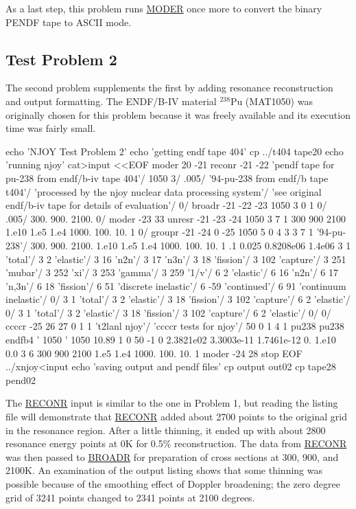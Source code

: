 As a last step, this problem runs \hyperlink{sMODERhy}{MODER}
once more to convert the binary PENDF tape to ASCII mode.


\subsection{Test Problem 2}
\label{ssMandT_2}

The second problem supplements the first by adding resonance
reconstruction and output formatting.  The ENDF/B-IV material
$^{238}$Pu (MAT1050) was originally chosen for this problem because
it was freely available and its execution time was fairly small.

\small
\begin{ccode}

echo 'NJOY Test Problem 2'
echo 'getting endf tape 404'
cp ../t404 tape20
echo 'running njoy'
cat>input <<EOF
 moder
 20 -21
 reconr
 -21 -22
 'pendf tape for pu-238 from endf/b-iv tape 404'/
 1050 3/
 .005/
 '94-pu-238 from endf/b tape t404'/
 'processed by the njoy nuclear data processing system'/
 'see original endf/b-iv tape for details of evaluation'/
 0/
 broadr
 -21 -22 -23
 1050 3 0 1 0/
 .005/
 300. 900. 2100.
 0/
 moder
 -23 33
 unresr
 -21 -23 -24
 1050 3 7 1
 300 900 2100
 1.e10 1.e5 1.e4 1000. 100. 10. 1
 0/
 groupr
 -21 -24 0 -25
 1050 5 0 4 3 3 7 1
 '94-pu-238'/
 300. 900. 2100.
 1.e10 1.e5 1.e4 1000. 100. 10. 1
 .1 0.025 0.8208e06 1.4e06
 3 1 'total'/
 3 2 'elastic'/
 3 16 'n2n'/
 3 17 'n3n'/
 3 18 'fission'/
 3 102 'capture'/
 3 251 'mubar'/
 3 252 'xi'/
 3 253 'gamma'/
 3 259 '1/v'/
 6 2 'elastic'/
 6 16 'n2n'/
 6 17 'n,3n'/
 6 18 'fission'/
 6 51 'discrete inelastic'/
 6 -59 'continued'/
 6 91 'continuum inelastic'/
 0/
 3 1 'total'/
 3 2 'elastic'/
 3 18 'fission'/
 3 102 'capture'/
 6 2 'elastic'/
 0/
 3 1 'total'/
 3 2 'elastic'/
 3 18 'fission'/
 3 102 'capture'/
 6 2 'elastic'/
 0/
 0/
 ccccr
 -25 26 27 0
 1 1 't2lanl njoy'/
 'ccccr tests for njoy'/
 50 0 1 4 1
 pu238 pu238 endfb4 ' 1050 ' 1050 10.89
 1 0 50 -1
 0 2.3821e02 3.3003e-11 1.7461e-12 0. 1.e10 0.0
 3 6
 300 900 2100
 1.e5 1.e4 1000. 100. 10. 1
 moder
 -24 28
 stop
EOF
../xnjoy<input
echo 'saving output and pendf files'
cp output out02
cp tape28 pend02

\end{ccode}
\normalsize

The \hyperlink{sRECONRhy}{RECONR} input is similar to the one
in Problem 1, but reading the listing file will demonstrate that
\hyperlink{sRECONRhy}{RECONR} added about 2700
points to the original grid in the resonance region.  After a
little thinning, it ended up with about 2800 resonance energy
points at 0K for 0.5\% reconstruction.  The data from
\hyperlink{sRECONRhy}{RECONR} was then passed to
\hyperlink{sBROADRhy}{BROADR} for preparation of cross sections
at 300, 900, and 2100K.  An examination of the output listing
shows that some thinning was possible because of the smoothing
effect of Doppler broadening; the zero degree grid of 3241 points
changed to 2341 points at 2100 degrees.

